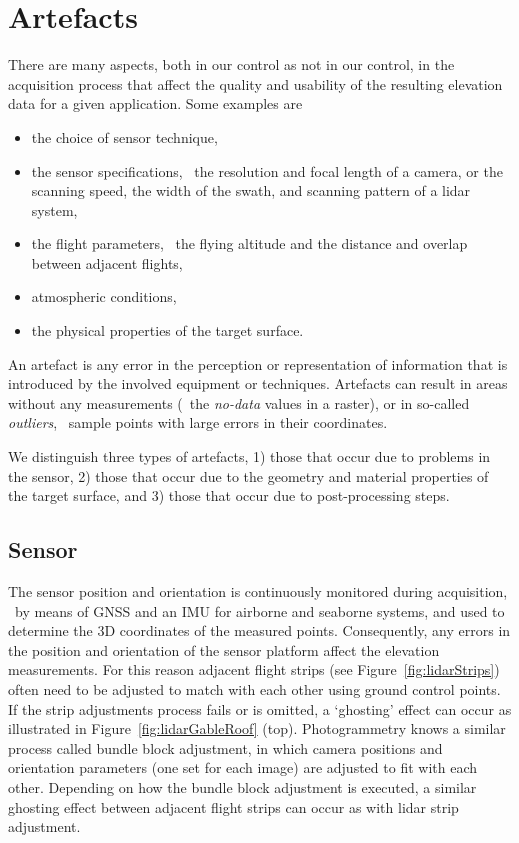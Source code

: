 \section{Artefacts}
\label{sec:artefacts}
There are many aspects, both in our control as not in our control, in the acquisition process that affect the quality and usability of the resulting elevation data for a given application. Some examples are
\begin{itemize}
	\item the choice of sensor technique, 
	\item the sensor specifications, \eg\ the resolution and focal length of a camera, or the scanning speed, the width of the swath, and scanning pattern of a lidar system,
	\item the flight parameters, \eg\ the flying altitude and the distance and overlap between adjacent flights,
	\item atmospheric conditions, 
	\item the physical properties of the target surface.
\end{itemize}

An artefact is any error in the perception or representation of information that is introduced by the involved equipment or techniques. 
Artefacts can result in areas without any measurements (\eg\ the \emph{no-data} values in a raster), or in so-called \emph{outliers}, \ie\ sample points with large errors in their coordinates. 

We distinguish three types of artefacts, 1) those that occur due to problems in the sensor, 2) those that occur due to the geometry and material properties of the target surface, and 3) those that occur due to post-processing steps.


\subsection{Sensor}
The sensor position and orientation is continuously monitored during acquisition, \eg\  by means of GNSS and an IMU for airborne and seaborne systems, and used to determine the 3D coordinates of the measured points. 
Consequently, any errors in the position and orientation of the sensor platform affect the elevation measurements. 
For this reason adjacent flight strips (see Figure~\ref{fig:lidarStrips}) often need to be adjusted to match with each other using ground control points. 
If the strip adjustments process fails or is omitted, a `ghosting' effect can occur as illustrated in Figure~\ref{fig:lidarGableRoof} (top). 
Photogrammetry knows a similar process called bundle block adjustment, in which camera positions and orientation parameters (one set for each image) are adjusted to fit with each other. Depending on how the bundle block adjustment is executed, a similar ghosting effect between adjacent flight strips can occur as with lidar strip adjustment. 
	
